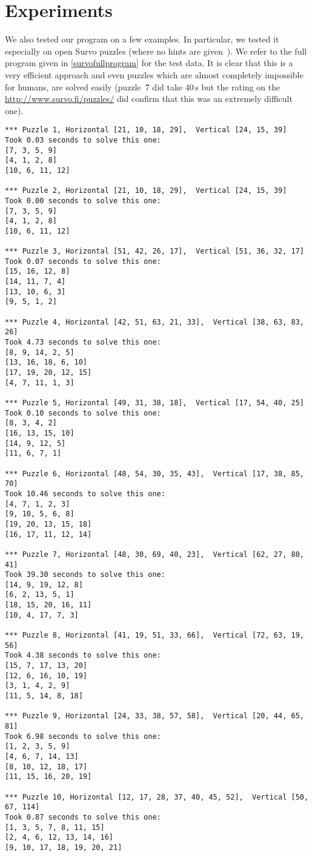 \documentclass[a4paper,11pt,english]{article}
\begin{document}
\section{Experiments}
We also tested our program on a few examples. In particular, we tested it especially on open Survo puzzles (where no hints are given~\cite{opensurvo}).
We refer to the full program given in \autoref{survofullprogram} for the test data.
It is clear that this is a very efficient approach and even puzzles which are almost completely impossible for humans, are solved easily (puzzle~7 did take 40\,s but the rating on the \url{http://www.survo.fi/puzzles/} did confirm that this was an extremely difficult one).
\begin{verbatim}
*** Puzzle 1, Horizontal [21, 10, 18, 29],  Vertical [24, 15, 39]
Took 0.03 seconds to solve this one:
[7, 3, 5, 9]
[4, 1, 2, 8]
[10, 6, 11, 12]

*** Puzzle 2, Horizontal [21, 10, 18, 29],  Vertical [24, 15, 39]
Took 0.00 seconds to solve this one:
[7, 3, 5, 9]
[4, 1, 2, 8]
[10, 6, 11, 12]

*** Puzzle 3, Horizontal [51, 42, 26, 17],  Vertical [51, 36, 32, 17]
Took 0.07 seconds to solve this one:
[15, 16, 12, 8]
[14, 11, 7, 4]
[13, 10, 6, 3]
[9, 5, 1, 2]

*** Puzzle 4, Horizontal [42, 51, 63, 21, 33],  Vertical [38, 63, 83, 26]
Took 4.73 seconds to solve this one:
[8, 9, 14, 2, 5]
[13, 16, 18, 6, 10]
[17, 19, 20, 12, 15]
[4, 7, 11, 1, 3]

*** Puzzle 5, Horizontal [49, 31, 38, 18],  Vertical [17, 54, 40, 25]
Took 0.10 seconds to solve this one:
[8, 3, 4, 2]
[16, 13, 15, 10]
[14, 9, 12, 5]
[11, 6, 7, 1]

*** Puzzle 6, Horizontal [48, 54, 30, 35, 43],  Vertical [17, 38, 85, 70]
Took 10.46 seconds to solve this one:
[4, 7, 1, 2, 3]
[9, 10, 5, 6, 8]
[19, 20, 13, 15, 18]
[16, 17, 11, 12, 14]

*** Puzzle 7, Horizontal [48, 30, 69, 40, 23],  Vertical [62, 27, 80, 41]
Took 39.30 seconds to solve this one:
[14, 9, 19, 12, 8]
[6, 2, 13, 5, 1]
[18, 15, 20, 16, 11]
[10, 4, 17, 7, 3]

*** Puzzle 8, Horizontal [41, 19, 51, 33, 66],  Vertical [72, 63, 19, 56]
Took 4.38 seconds to solve this one:
[15, 7, 17, 13, 20]
[12, 6, 16, 10, 19]
[3, 1, 4, 2, 9]
[11, 5, 14, 8, 18]

*** Puzzle 9, Horizontal [24, 33, 38, 57, 58],  Vertical [20, 44, 65, 81]
Took 6.98 seconds to solve this one:
[1, 2, 3, 5, 9]
[4, 6, 7, 14, 13]
[8, 10, 12, 18, 17]
[11, 15, 16, 20, 19]

*** Puzzle 10, Horizontal [12, 17, 28, 37, 40, 45, 52],  Vertical [50, 67, 114]
Took 0.87 seconds to solve this one:
[1, 3, 5, 7, 8, 11, 15]
[2, 4, 6, 12, 13, 14, 16]
[9, 10, 17, 18, 19, 20, 21]
\end{verbatim}
\end{document}
